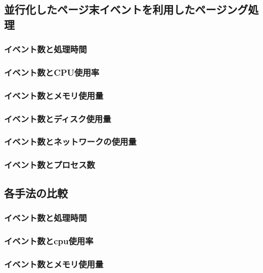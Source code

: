 \documentclass[../../main]{subfiles}
\begin{document}
    \subsection{並行化したページ末イベントを利用したページング処理}\label{subsec:result-paging-last-async}
    \subsubsection{イベント数と処理時間}\label{subsubsec:result-paging-last-async-time}
    \subsubsection{イベント数とCPU使用率}\label{subsubsec:result-paging-last-async-cpu}
    \subsubsection{イベント数とメモリ使用量}\label{subsubsec:result-paging-last-async-memory}
    \subsubsection{イベント数とディスク使用量}\label{subsubsec:result-paging-last-async-disk}
    \subsubsection{イベント数とネットワークの使用量}\label{subsubsec:result-paging-last-async-network}
    \subsubsection{イベント数とプロセス数}\label{subsubsec:result-paging-last-async-process}

    \subsection{各手法の比較}\label{subsec:result-cpu}
    \subsubsection{イベント数と処理時間}\label{subsubsec:result-time}
    \subsubsection{イベント数とcpu使用率}\label{subsubsec:result-cpu}
    \subsubsection{イベント数とメモリ使用量}\label{subsubsec:result-memory}
\end{document}
